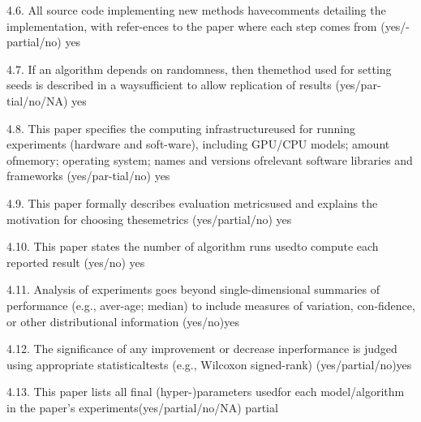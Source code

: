 \documentclass[
  10
]{article}
\begin{document}
4.6. All source code implementing new methods havecomments detailing the
implementation, with refer-ences to the paper where each step comes from
(yes/-partial/no) yes

4.7. If an algorithm depends on randomness, then themethod used for
setting seeds is described in a waysufficient to allow replication of
results (yes/par-tial/no/NA) yes

4.8. This paper specifies the computing infrastructureused for running
experiments (hardware and soft-ware), including GPU/CPU models; amount
ofmemory; operating system; names and versions ofrelevant software
libraries and frameworks (yes/par-tial/no) yes

4.9. This paper formally describes evaluation metricsused and explains
the motivation for choosing thesemetrics (yes/partial/no) yes

4.10. This paper states the number of algorithm runs usedto compute each
reported result (yes/no) yes

4.11. Analysis of experiments goes beyond single-dimensional summaries
of performance (e.g., aver-age; median) to include measures of
variation, con-fidence, or other distributional information (yes/no)yes

4.12. The significance of any improvement or decrease inperformance is
judged using appropriate statisticaltests (e.g., Wilcoxon signed-rank)
(yes/partial/no)yes

4.13. This paper lists all final (hyper-)parameters usedfor each
model/algorithm in the paper's experiments(yes/partial/no/NA) partial
\end{document}
